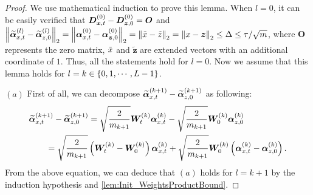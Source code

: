 \begin{proof}
  We use mathematical induction to prove this lemma.
  When $l=0$, it can be easily verified that $\boldsymbol{D}_{\boldsymbol{x},t}^{(0)} - \boldsymbol{D}_{\boldsymbol{z},0}^{(0)} = \bm{O}$ and $\norm{\widetilde{\bm{\alpha}}^{(l)}_{x,t} - \widetilde{\bm{\alpha}}_{z,0}^{(l)}}_2=\norm{{{\bm{\alpha}}}_{x,t}^{(0)} -{{\bm{\alpha}}}^{(0)}_{\bm{z},0}}_2=\norm{\tilde{x}-\tilde{z}}_2 = \norm{x-{\bm{z}}}_2 \leq \Delta\leq \tau/\sqrt{m}$, where $\bm{O}$ represents the zero matrix, $\tilde{x}$ and $\tilde{\bm{z}}$ are extended vectors with an additional coordinate of $1$.
  Thus, all the statements hold for $l=0$.
  Now we assume that this lemma holds for $l=k\in\left\{0,1,\cdots,L-1\right\}$.

  $(a)$  First of all, we can decompose $\widetilde{\bm{\alpha}}^{(k+1)}_{x,t} -\widetilde{\bm{\alpha}}^{(k+1)}_{z,0}$ as following:
  \begin{equation*}
    \begin{aligned}
      &\widetilde{\bm{\alpha}}^{(k+1)}_{x,t} -\widetilde{\bm{\alpha}}^{(k+1)}_{z,0}=
      \sqrt{\frac{2}{m_{k+1}}} \bm{W}^{(k)}_t {\bm{\alpha}}^{(k)}_{x,t} - \sqrt{\frac{2}{m_{k+1}}} \bm{W}_0^{(k)}{\bm{\alpha}}^{(k)}_{z,0}\\
      &\qquad=\sqrt{\frac{2}{m_{k+1}}} \left(\bm{W}^{(k)}_t - \bm{W}^{(k)}_0\right) {\bm{\alpha}}^{(k)}_{x,t} + \sqrt{\frac{2}{m_{k+1}}}\bm{W}^{(k)}_0 \left({\bm{\alpha}}^{(k)}_{x,t} - {\bm{\alpha}}^{(k)}_{z,0}\right).
    \end{aligned}
  \end{equation*}
  From the above equation, we can deduce that $(a)$ holds for $l=k+1$ by the induction hypothesis and \cref{lem:Init_WeightsProductBound}.


\end{proof}
